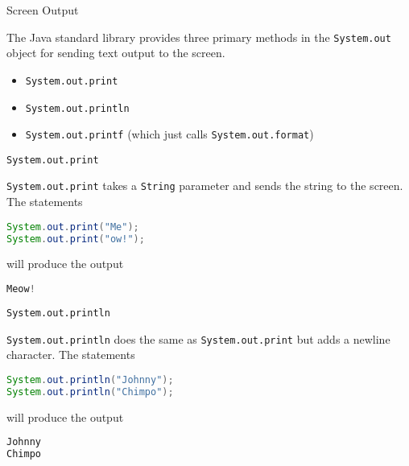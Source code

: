 \documentclass{beamer}
\begin{document}
\begin{frame}
  \titlepage
\end{frame}


\begin{frame}[fragile]{Screen Output}


The Java standard library provides three primary methods in the {\tt System.out} object for sending text output to the screen.

\begin{itemize}
\item {\tt System.out.print}
\item {\tt System.out.println}
\item {\tt System.out.printf} (which just calls {\tt System.out.format})
\end{itemize}

\end{frame}

\begin{frame}[fragile]{{\tt System.out.print}}


{\tt System.out.print} takes a {\tt String} parameter and sends the string to the screen.  The statements
\begin{lstlisting}[language=Java]
System.out.print("Me");
System.out.print("ow!");
\end{lstlisting}
will produce the output
\begin{lstlisting}[language=Java]
Meow!
\end{lstlisting}

\end{frame}

\begin{frame}[fragile]{{\tt System.out.println}}


{\tt System.out.println} does the same as {\tt System.out.print} but adds a newline character.  The statements
\begin{lstlisting}[language=Java]
System.out.println("Johnny");
System.out.println("Chimpo");
\end{lstlisting}
will produce the output
\begin{lstlisting}[language=Java]
Johnny
Chimpo
\end{lstlisting}

\end{frame}
\end{document}
